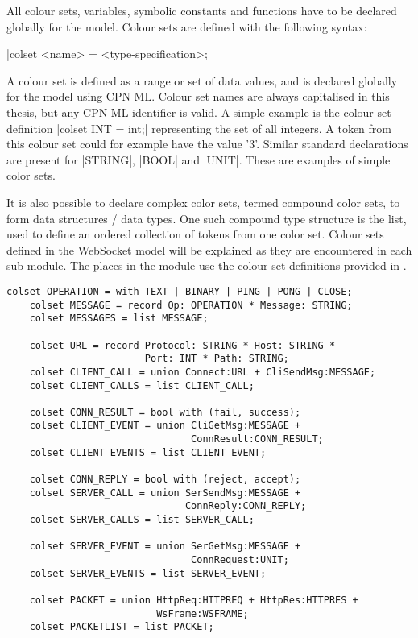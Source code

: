 	All colour sets, variables, symbolic constants and functions have to be
	declared globally for the model. Colour sets are defined with the following syntax:
	
	|colset <name> = <type-specification>;|
	
	A colour set is defined as a range or set of data
	values, and is declared globally for the model using CPN ML. Colour set names
	are always capitalised in this thesis, but any CPN ML identifier is valid. A
	simple example is the colour set definition |colset INT = int;| representing
	the set of all integers.
	A token from this colour set could for example have the value '3'. Similar
	standard declarations are present for |STRING|, |BOOL| and |UNIT|.
	These are examples of simple color sets. 
	
	It is also possible to declare complex color sets, termed compound color
	sets, to form data structures / data types. One such compound type structure is
	the list, used to define an ordered collection of tokens from one color set.
	Colour sets defined in the WebSocket model will be explained as they are
	encountered in each sub-module. The places in the  module use the
	colour set definitions provided in .
	
	\begin{lstlisting}[label=lst:overview_colset,caption=Overview colour
	sets,gobble=1,tabsize=4,float=tbh] 
	colset OPERATION = with TEXT | BINARY | PING | PONG | CLOSE; 
	colset MESSAGE = record Op: OPERATION *	Message: STRING;
	colset MESSAGES = list MESSAGE;
	
	colset URL = record Protocol: STRING * Host: STRING * 
						Port: INT * Path: STRING;
	colset CLIENT_CALL = union Connect:URL + CliSendMsg:MESSAGE;
	colset CLIENT_CALLS = list CLIENT_CALL;
	
	colset CONN_RESULT = bool with (fail, success);
	colset CLIENT_EVENT = union CliGetMsg:MESSAGE + 
								ConnResult:CONN_RESULT;
	colset CLIENT_EVENTS = list CLIENT_EVENT;
	
	colset CONN_REPLY = bool with (reject, accept);
	colset SERVER_CALL = union SerSendMsg:MESSAGE + 
							   ConnReply:CONN_REPLY;
	colset SERVER_CALLS = list SERVER_CALL;
	
	colset SERVER_EVENT = union SerGetMsg:MESSAGE + 
								ConnRequest:UNIT;
	colset SERVER_EVENTS = list SERVER_EVENT;
	
	colset PACKET = union HttpReq:HTTPREQ + HttpRes:HTTPRES + 
						  WsFrame:WSFRAME;
	colset PACKETLIST = list PACKET;
	\end{lstlisting}
	

